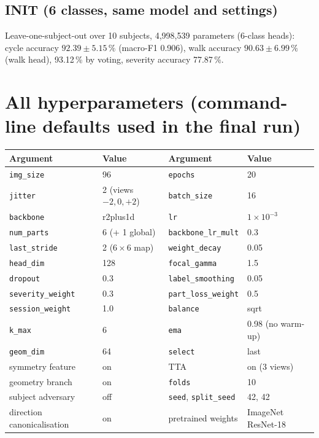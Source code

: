 \documentclass[10pt,a4paper]{article}
\begin{document}
\subsection{INIT (6 classes, same model and settings)}
Leave-one-subject-out over 10 subjects, 4{,}998{,}539 parameters (6-class heads):
cycle accuracy $92.39\pm5.15\,\%$ (macro-F1 0.906), walk accuracy $90.63\pm6.99\,\%$ (walk head),
93.12\,\% by voting, severity accuracy 77.87\,\%.

\section{All hyperparameters (command-line defaults used in the final run)}
\begin{center}
\small
\begin{tabular}{@{}ll@{\qquad}ll@{}}
\toprule
Argument & Value & Argument & Value \\
\midrule
\texttt{img\_size} & 96 & \texttt{epochs} & 20 \\
\texttt{jitter} & 2 (views $-2, 0, +2$) & \texttt{batch\_size} & 16 \\
\texttt{backbone} & r2plus1d & \texttt{lr} & $1\times10^{-3}$ \\
\texttt{num\_parts} & 6 (+ 1 global) & \texttt{backbone\_lr\_mult} & 0.3 \\
\texttt{last\_stride} & 2 ($6\times6$ map) & \texttt{weight\_decay} & 0.05 \\
\texttt{head\_dim} & 128 & \texttt{focal\_gamma} & 1.5 \\
\texttt{dropout} & 0.3 & \texttt{label\_smoothing} & 0.05 \\
\texttt{severity\_weight} & 0.3 & \texttt{part\_loss\_weight} & 0.5 \\
\texttt{session\_weight} & 1.0 & \texttt{balance} & sqrt \\
\texttt{k\_max} & 6 & \texttt{ema} & 0.98 (no warm-up) \\
\texttt{geom\_dim} & 64 & \texttt{select} & last \\
symmetry feature & on & TTA & on (3 views) \\
geometry branch & on & \texttt{folds} & 10 \\
subject adversary & off & \texttt{seed}, \texttt{split\_seed} & 42, 42 \\
direction canonicalisation & on & pretrained weights & ImageNet ResNet-18 \\
\bottomrule
\end{tabular}
\end{center}
\end{document}
